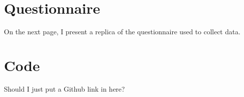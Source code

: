 \documentclass[12pt,a4paper]{report}
\begin{document}











\appendix

\chapter{Questionnaire}\label{app:quest}
On the next page, I present a replica of the questionnaire used to collect data.



\chapter{Code}\label{app:launch}

Should I just put a Github link in here?



\end{document}
